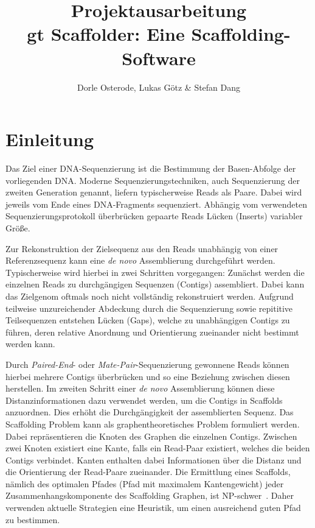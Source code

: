 \documentclass[a4paper,10pt,parskip]{scrartcl}
\title{Projektausarbeitung \\\vspace{.5cm} \large gt Scaffolder: Eine Scaffolding-Software}
\author{Dorle Osterode, Lukas Götz \& Stefan Dang}
\date{}
\begin{document}
\maketitle{}
\thispagestyle{empty}
\begin{abstract}
\end{abstract}

\newpage{}
\thispagestyle{empty}
\tableofcontents{}
\newpage{}
\setcounter{page}{1}
\section{Einleitung}

Das Ziel einer DNA-Sequenzierung ist die Bestimmung der Basen-Abfolge der vorliegenden DNA. Moderne Sequenzierungstechniken, auch Sequenzierung der zweiten Generation genannt, liefern typischerweise Reads als Paare. Dabei wird jeweils vom Ende eines DNA-Fragments sequenziert. Abhängig vom verwendeten Sequenzierungsprotokoll überbrücken gepaarte Reads Lücken (Inserts) variabler Größe.

Zur Rekonstruktion der Zielsequenz aus den Reads unabhängig von einer Referenzsequenz kann eine \textit{de novo} Assemblierung durchgeführt werden. Typischerweise wird hierbei in zwei Schritten vorgegangen: Zunächst werden die einzelnen Reads zu durchgängigen Sequenzen (Contigs) assembliert. Dabei kann das Zielgenom oftmals noch nicht vollständig rekonstruiert werden. Aufgrund teilweise unzureichender Abdeckung durch die Sequenzierung sowie repititive Teilsequenzen entstehen Lücken (Gaps), welche zu unabhängigen Contigs zu führen, deren relative Anordnung und Orientierung zueinander nicht bestimmt werden kann.

Durch \textit{Paired-End}- oder \textit{Mate-Pair}-Sequenzierung gewonnene Reads können hierbei mehrere Contigs überbrücken und so eine Beziehung zwischen diesen herstellen. Im zweiten Schritt einer \textit{de novo} Assemblierung können diese Distanzinformationen dazu verwendet werden, um die Contigs in Scaffolds anzuordnen. Dies erhöht die Durchgängigkeit der assemblierten Sequenz.
Das Scaffolding Problem kann als graphentheoretisches Problem formuliert werden. Dabei repräsentieren die Knoten des Graphen die einzelnen Contigs. Zwischen zwei Knoten existiert eine Kante, falls ein Read-Paar existiert, welches die beiden Contigs verbindet. Kanten enthalten dabei Informationen über die Distanz und die Orientierung der Read-Paare zueinander. Die Ermittlung eines Scaffolds, nämlich des optimalen Pfades (Pfad mit maximalem Kantengewicht) jeder Zusammenhangskomponente des Scaffolding Graphen, ist NP-schwer~\cite{Huson:2002kf}. Daher verwenden aktuelle Strategien eine Heuristik, um einen ausreichend guten Pfad zu bestimmen.
\end{document}
